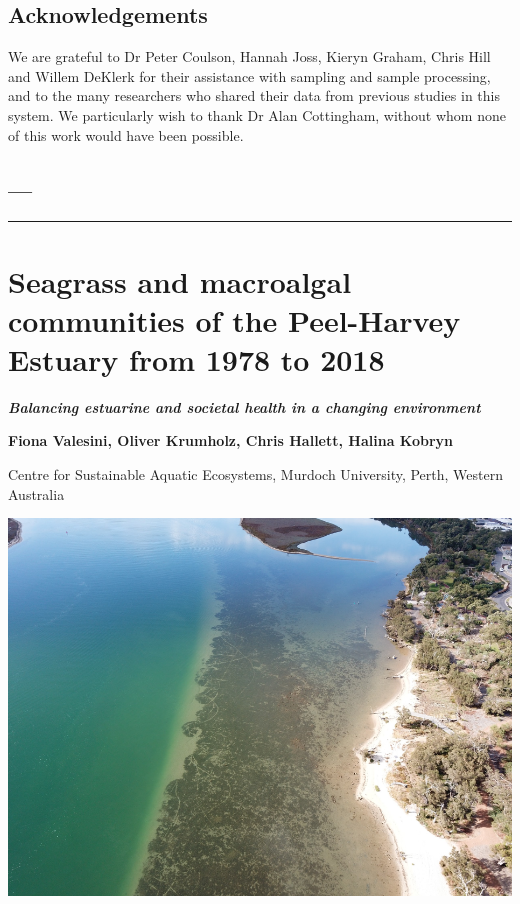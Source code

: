 \documentclass[
]{book}
\begin{document}
\hypertarget{acknowledgements-1}{%
\section{Acknowledgements}\label{acknowledgements-1}}

We are grateful to Dr Peter Coulson, Hannah Joss, Kieryn Graham, Chris Hill and Willem DeKlerk for their assistance with sampling and sample processing, and to the many researchers who shared their data from previous studies in this system. We particularly wish to thank Dr Alan Cottingham, without whom none of this work would have been possible.

\hypertarget{section}{%
\section{---}\label{section}}

\begin{center}\rule{0.5\linewidth}{0.5pt}\end{center}

\hypertarget{macrophytes}{%
\chapter{Seagrass and macroalgal communities of the Peel-Harvey Estuary from 1978 to 2018}\label{macrophytes}}

{\textbf{\emph{Balancing estuarine and societal health in a changing environment}}}

{\textbf{Fiona Valesini, Oliver Krumholz, Chris Hallett, Halina Kobryn}}

{Centre for Sustainable Aquatic Ecosystems, Murdoch University, Perth, Western Australia}

\includegraphics[width=1\linewidth]{images/macrophytes/picture1}
\end{document}
